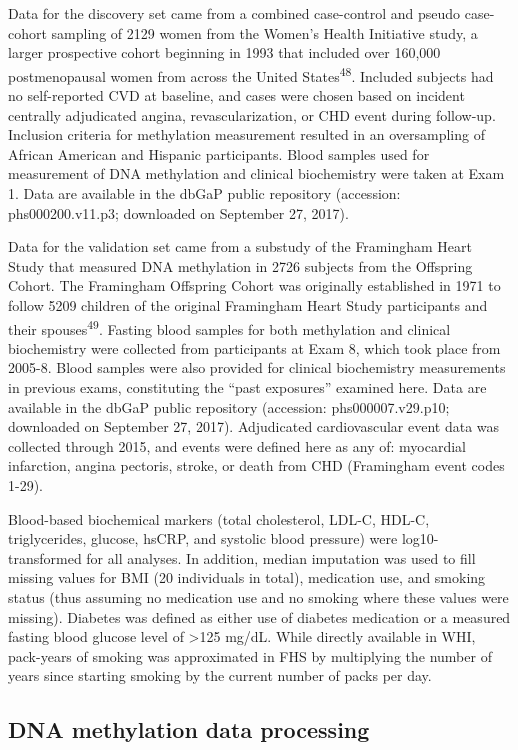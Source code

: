 \documentclass[]{article}
\theoremstyle{definition}
\theoremstyle{definition}
\theoremstyle{definition}
\theoremstyle{remark}
\begin{document}
Data for the discovery set came from a combined case-control and pseudo
case-cohort sampling of 2129 women from the Women's Health Initiative
study, a larger prospective cohort beginning in 1993 that included over
160,000 postmenopausal women from across the United
States\textsuperscript{48}. Included subjects had no self-reported CVD
at baseline, and cases were chosen based on incident centrally
adjudicated angina, revascularization, or CHD event during follow-up.
Inclusion criteria for methylation measurement resulted in an
oversampling of African American and Hispanic participants. Blood
samples used for measurement of DNA methylation and clinical
biochemistry were taken at Exam 1. Data are available in the dbGaP
public repository (accession: phs000200.v11.p3; downloaded on September
27, 2017).

Data for the validation set came from a substudy of the Framingham Heart
Study that measured DNA methylation in 2726 subjects from the Offspring
Cohort. The Framingham Offspring Cohort was originally established in
1971 to follow 5209 children of the original Framingham Heart Study
participants and their spouses\textsuperscript{49}. Fasting blood
samples for both methylation and clinical biochemistry were collected
from participants at Exam 8, which took place from 2005-8. Blood samples
were also provided for clinical biochemistry measurements in previous
exams, constituting the ``past exposures'' examined here. Data are
available in the dbGaP public repository (accession: phs000007.v29.p10;
downloaded on September 27, 2017). Adjudicated cardiovascular event data
was collected through 2015, and events were defined here as any of:
myocardial infarction, angina pectoris, stroke, or death from CHD
(Framingham event codes 1-29).

Blood-based biochemical markers (total cholesterol, LDL-C, HDL-C,
triglycerides, glucose, hsCRP, and systolic blood pressure) were
log10-transformed for all analyses. In addition, median imputation was
used to fill missing values for BMI (20 individuals in total),
medication use, and smoking status (thus assuming no medication use and
no smoking where these values were missing). Diabetes was defined as
either use of diabetes medication or a measured fasting blood glucose
level of \textgreater{}125 mg/dL. While directly available in WHI,
pack-years of smoking was approximated in FHS by multiplying the number
of years since starting smoking by the current number of packs per day.

\subsection{DNA methylation data
processing}\label{dna-methylation-data-processing}
\end{document}
